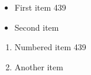 \documentclass{article}
\begin{document}
\begin{itemize}
\item First item 439
\item Second item
\end{itemize}
\begin{enumerate}
\item Numbered item 439
\item Another item
\end{enumerate}
\end{document}
